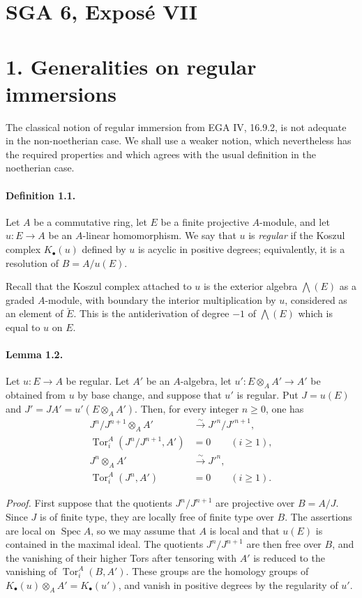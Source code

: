 \documentclass[11pt]{article}
\theoremstyle{plain}
\theoremstyle{definition}
\theoremstyle{remark}
\DeclareMathOperator{\Spec}{Spec}
\DeclareMathOperator{\Tor}{Tor}
\providecommand{\iso}{\xrightarrow{\sim}}
\begin{document}
\clearpage
\section*{SGA 6, Exposé VII}

\section*{1. Generalities on regular immersions}

The classical notion of regular immersion from EGA IV, 16.9.2, is not adequate in the non-noetherian case. We shall use a weaker notion, which nevertheless has the required properties and which agrees with the usual definition in the noetherian case.

\paragraph{Definition 1.1.} Let $A$ be a commutative ring, let $E$ be a finite projective $A$-module, and let $u:E\to A$ be an $A$-linear homomorphism. We say that $u$ is \emph{regular} if the Koszul complex $K_\bullet(u)$ defined by $u$ is acyclic in positive degrees; equivalently, it is a resolution of $B=A/u(E)$.

Recall that the Koszul complex attached to $u$ is the exterior algebra $\bigwedge(E)$ as a graded $A$-module, with boundary the interior multiplication by $u$, considered as an element of $\check E$. This is the antiderivation of degree $-1$ of $\bigwedge(E)$ which is equal to $u$ on $E$.

\paragraph{Lemma 1.2.} Let $u:E\to A$ be regular. Let $A'$ be an $A$-algebra, let $u':E\otimes_AA'\to A'$ be obtained from $u$ by base change, and suppose that $u'$ is regular. Put $J=u(E)$ and $J'=JA'=u'(E\otimes_AA')$. Then, for every integer $n\geq0$, one has
\begin{align*}
J^n/J^{n+1}\otimes_AA'&\iso J'^n/J'^{n+1},\\
\Tor_i^A(J^n/J^{n+1},A')&=0 \qquad (i\geq1),\\
J^n\otimes_AA'&\iso J'^n,\\
\Tor_i^A(J^n,A')&=0 \qquad (i\geq1).
\end{align*}

\emph{Proof.} First suppose that the quotients $J^n/J^{n+1}$ are projective over $B=A/J$. Since $J$ is of finite type, they are locally free of finite type over $B$. The assertions are local on $\Spec A$, so we may assume that $A$ is local and that $u(E)$ is contained in the maximal ideal. The quotients $J^n/J^{n+1}$ are then free over $B$, and the vanishing of their higher Tors after tensoring with $A'$ is reduced to the vanishing of $\Tor_i^A(B,A')$. These groups are the homology groups of $K_\bullet(u)\otimes_AA'=K_\bullet(u')$, and vanish in positive degrees by the regularity of $u'$.
\end{document}
